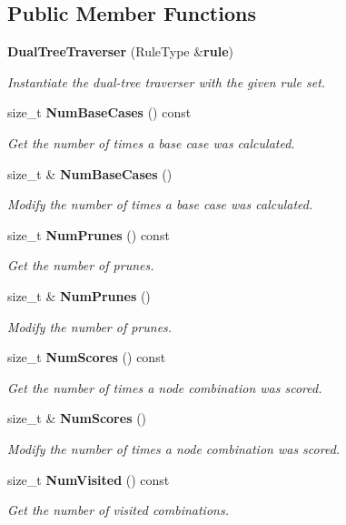 \subsection*{Public Member Functions}
\begin{DoxyCompactItemize}
\item 
{\bf Dual\-Tree\-Traverser} (Rule\-Type \&{\bf rule})
\begin{DoxyCompactList}\small\item\em Instantiate the dual-\/tree traverser with the given rule set. \end{DoxyCompactList}\item 
size\-\_\-t {\bf Num\-Base\-Cases} () const 
\begin{DoxyCompactList}\small\item\em Get the number of times a base case was calculated. \end{DoxyCompactList}\item 
size\-\_\-t \& {\bf Num\-Base\-Cases} ()
\begin{DoxyCompactList}\small\item\em Modify the number of times a base case was calculated. \end{DoxyCompactList}\item 
size\-\_\-t {\bf Num\-Prunes} () const 
\begin{DoxyCompactList}\small\item\em Get the number of prunes. \end{DoxyCompactList}\item 
size\-\_\-t \& {\bf Num\-Prunes} ()
\begin{DoxyCompactList}\small\item\em Modify the number of prunes. \end{DoxyCompactList}\item 
size\-\_\-t {\bf Num\-Scores} () const 
\begin{DoxyCompactList}\small\item\em Get the number of times a node combination was scored. \end{DoxyCompactList}\item 
size\-\_\-t \& {\bf Num\-Scores} ()
\begin{DoxyCompactList}\small\item\em Modify the number of times a node combination was scored. \end{DoxyCompactList}\item 
size\-\_\-t {\bf Num\-Visited} () const 
\begin{DoxyCompactList}\small\item\em Get the number of visited combinations. \end{DoxyCompactList}\item 

\end{DoxyCompactItemize}
